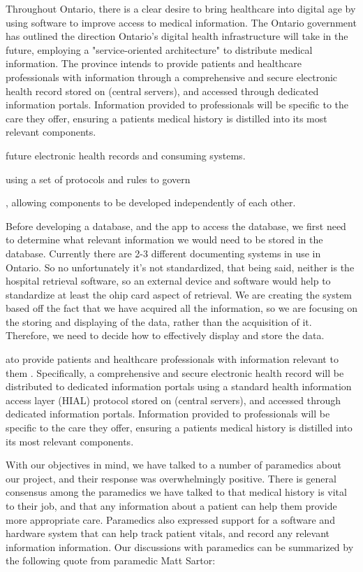 \iffalse

Throughout Ontario, there is a clear desire to bring healthcare into digital age by using software to improve access to medical information. The Ontario government has outlined the direction Ontario's digital health infrastructure will take in the future, employing a "service-oriented architecture" to distribute medical information.  The province intends to provide patients and healthcare professionals with information through a comprehensive and secure electronic health record stored on (central servers), and accessed through dedicated information portals. Information provided to professionals will be specific to the care they offer, ensuring a patients medical history is distilled into its most relevant components.


future electronic health records and consuming systems.

 using a set of protocols and rules to govern


, allowing components to be developed independently of each other.






Before developing a database, and the app to access the database, we first need to determine what relevant information we would need to be stored in the database. Currently there are 2-3 different documenting systems in use in Ontario. So no unfortunately it's not standardized, that being said, neither is the hospital retrieval software, so an external device and software would help to standardize at least the ohip card aspect of retrieval.
We are creating the system based off the fact that we have acquired all the information, so we are focusing on the storing and displaying of the data, rather than the acquisition of it. Therefore, we need to decide how to effectively display and store the data.




ato provide patients and healthcare professionals with information relevant to them \cite{b1}. Specifically, a comprehensive and secure electronic health record will be distributed to dedicated information portals using a standard health information access layer (HIAL) protocol  stored on (central servers), and accessed through dedicated information portals. Information provided to professionals will be specific to the care they offer, ensuring a patients medical history is distilled into its most relevant components.


With our objectives in mind, we have talked to a number of paramedics about our project, and their response was overwhelmingly positive. There is general consensus among the paramedics we have talked to that medical history is vital to their job, and that any information about a patient can help them provide more appropriate care. Paramedics also expressed support for a software and hardware system that can help track patient vitals, and record any relevant information information. Our discussions with paramedics can be summarized by the following quote from paramedic Matt Sartor:

